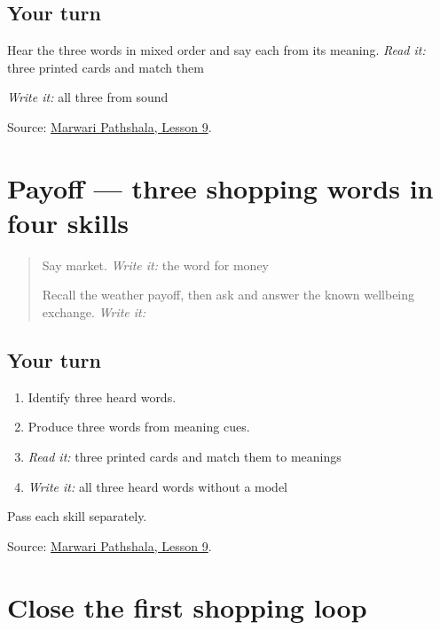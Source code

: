 \subsection*{Your turn}
Hear the three words in mixed order and say each from its meaning. \emph{Read it:} three printed cards and match them

\emph{Write it:} all three from sound

\begin{tcolorbox}[breakable,colback=teal!4,colframe=teal!35!black,title={Before you move on}]
Source: \href{https://www.marwaripathshala.com/marwari-lesson-9-english}{Marwari Pathshala, Lesson 9}.
\end{tcolorbox}
\section[Practice]{Payoff — three shopping words in four skills}

\label{lesson:MW-C13-shopping-three}



\begin{quote}
Say market. \emph{Write it:} the word for money

Recall the weather payoff, then ask and answer the known wellbeing exchange. \emph{Write it:} \textbf{}
\end{quote}

\subsection*{Your turn}
\begin{enumerate}
\raggedright
  \item Identify three heard words.
  \item Produce three words from meaning cues.
  \item \emph{Read it:} three printed cards and match them to meanings
  \item \emph{Write it:} all three heard words without a model
\end{enumerate}

Pass each skill separately.

\begin{tcolorbox}[breakable,colback=teal!4,colframe=teal!35!black,title={Before you move on}]
Source: \href{https://www.marwaripathshala.com/marwari-lesson-9-english}{Marwari Pathshala, Lesson 9}.
\end{tcolorbox}
\section[Practice]{Close the first shopping loop}

